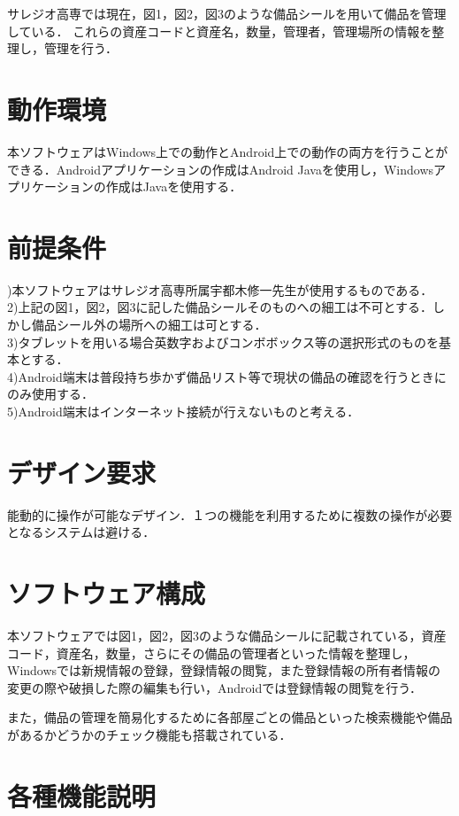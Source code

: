 \documentclass[11pt,a4j]{jarticle}
\begin{document}
サレジオ高専では現在，図1，図2，図3のような備品シールを用いて備品を管理している．
これらの資産コードと資産名，数量，管理者，管理場所の情報を整理し，管理を行う．

  \section{動作環境}
本ソフトウェアはWindows上での動作とAndroid上での動作の両方を行うことができる．Androidアプリケーションの作成はAndroid Javaを使用し，Windowsアプリケーションの作成はJavaを使用する．

  \section{前提条件}
  )本ソフトウェアはサレジオ高専所属宇都木修一先生が使用するものである．
\\2)上記の図1，図2，図3に記した備品シールそのものへの細工は不可とする．しかし備品シール外の場所への細工は可とする．
\\3)タブレットを用いる場合英数字およびコンボボックス等の選択形式のものを基本とする．
\\4)Android端末は普段持ち歩かず備品リスト等で現状の備品の確認を行うときにのみ使用する．
\\5)Android端末はインターネット接続が行えないものと考える．

  \section{デザイン要求}
  能動的に操作が可能なデザイン．１つの機能を利用するために複数の操作が必要となるシステムは避ける．

  \section{ソフトウェア構成}
  本ソフトウェアでは図1，図2，図3のような備品シールに記載されている，資産コード，資産名，数量，さらにその備品の管理者といった情報を整理し，Windowsでは新規情報の登録，登録情報の閲覧，また登録情報の所有者情報の変更の際や破損した際の編集も行い，Androidでは登録情報の閲覧を行う．
  
  また，備品の管理を簡易化するために各部屋ごとの備品といった検索機能や備品があるかどうかのチェック機能も搭載されている．

  \newpage
  \section{各種機能説明}
\end{document}
